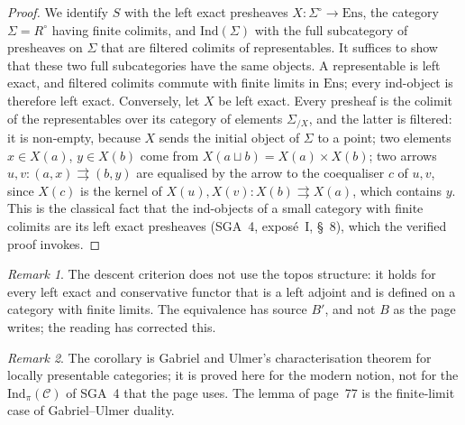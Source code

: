 \documentclass[11pt]{article}
\theoremstyle{plain}
\theoremstyle{definition}
\theoremstyle{remark}
\newtheorem*{remarque}{Remark}
\begin{document}
\begin{proof}
We identify $S$ with the left exact presheaves $X : \Sigma^\circ \to \mathrm{Ens}$, the category $\Sigma = R^\circ$ having finite colimits, and $\mathrm{Ind}(\Sigma)$ with the full subcategory of presheaves on $\Sigma$ that are filtered colimits of representables. It suffices to show that these two full subcategories have the same objects. A representable is left exact, and filtered colimits commute with finite limits in $\mathrm{Ens}$; every ind-object is therefore left exact. Conversely, let $X$ be left exact. Every presheaf is the colimit of the representables over its category of elements $\Sigma_{/X}$, and the latter is filtered: it is non-empty, because $X$ sends the initial object of $\Sigma$ to a point; two elements $x \in X(a)$, $y \in X(b)$ come from $X(a \sqcup b) = X(a) \times X(b)$; two arrows $u, v : (a, x) \rightrightarrows (b, y)$ are equalised by the arrow to the coequaliser $c$ of $u, v$, since $X(c)$ is the kernel of $X(u), X(v) : X(b) \rightrightarrows X(a)$, which contains $y$. This is the classical fact that the ind-objects of a small category with finite colimits are its left exact presheaves (SGA~4, exposé~I, §~8), which the verified proof invokes.
\end{proof}

\begin{remarque}
The descent criterion does not use the topos structure: it holds for every left exact and conservative functor that is a left adjoint and is defined on a category with finite limits. The equivalence has source $B'$, and not $B$ as the page writes; the reading has corrected this.
\end{remarque}

\begin{remarque}
The corollary is Gabriel and Ulmer's characterisation theorem for locally presentable categories; it is proved here for the modern notion, not for the $\mathrm{Ind}_\pi(\mathcal C)$ of SGA~4 that the page uses. The lemma of page~77 is the finite-limit case of Gabriel--Ulmer duality.
\end{remarque}
\end{document}

